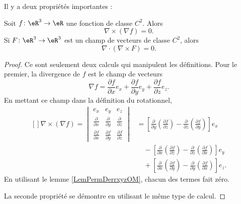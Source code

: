 Il y a deux propriétés importantes :
\begin{theorem}
    Soit $f\colon \eR^3\to \eR$ une fonction de classe $C^2$. Alors
    \begin{equation}
        \nabla\times(\nabla f)=0.
    \end{equation}
    Si $F\colon \eR^3\to \eR^3$ est un champ de vecteurs de classe $C^2$, alors
    \begin{equation}
        \nabla\cdot(\nabla\times F)=0.
    \end{equation}
\end{theorem}

\begin{proof}
    Ce sont seulement deux calculs qui manipulent les définitions. Pour le premier, la divergence de $f$ est le champ de vecteurs
    \begin{equation}
        \nabla f=\frac{ \partial f }{ \partial x }e_x+\frac{ \partial f }{ \partial y }e_y+\frac{ \partial f }{ \partial z }e_z.
    \end{equation}
    En mettant ce champ dans la définition du rotationnel,
    \begin{equation}
        \begin{aligned}[]
            \nabla\times(\nabla f)=\begin{vmatrix}
                 e_x   &   e_y    &   e_z    \\
                 \frac{ \partial  }{ \partial x }    &   \frac{ \partial  }{ \partial y }    &   \frac{ \partial  }{ \partial z }    \\
                 \frac{ \partial f }{ \partial x }    &   \frac{ \partial f }{ \partial y }    &   \frac{ \partial f }{ \partial z }
            \end{vmatrix}
            &=\left[ \frac{ \partial  }{ \partial y }\left( \frac{ \partial f }{ \partial z } \right)-\frac{ \partial  }{ \partial z }\left( \frac{ \partial f }{ \partial y } \right) \right]e_x\\
            &\quad-\left[ \frac{ \partial  }{ \partial x }\left( \frac{ \partial f }{ \partial z } \right)-\frac{ \partial  }{ \partial z }\left( \frac{ \partial f }{ \partial x } \right) \right]e_y\\
            &\quad+\left[ \frac{ \partial  }{ \partial x }\left( \frac{ \partial f }{ \partial y } \right)-\frac{ \partial  }{ \partial y }\left( \frac{ \partial f }{ \partial x } \right) \right]e_z.
        \end{aligned}
    \end{equation}
    En utilisant le lemme \ref{LemPermDerrxyzOM}, chacun des termes fait zéro.

    La seconde propriété se démontre en utilisant le même type de calcul.
\end{proof}

